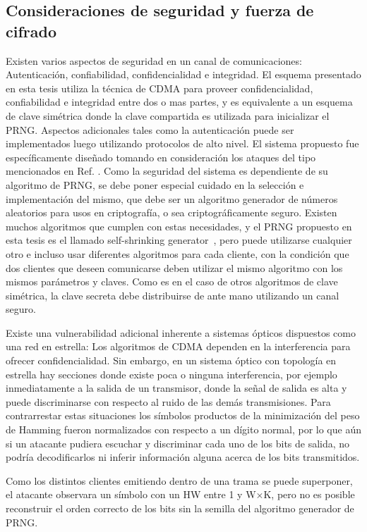 \subsection{Consideraciones de seguridad y fuerza de cifrado}\label{Seguridad-fuerza}
Existen varios aspectos de seguridad en un canal de comunicaciones: Autenticación, confiabilidad, confidencialidad e integridad.
El esquema presentado en esta tesis utiliza la técnica de CDMA para proveer confidencialidad, confiabilidad e integridad entre dos o mas partes, y es equivalente a un esquema de clave simétrica donde la clave compartida es utilizada para inicializar el PRNG. Aspectos adicionales tales como la autenticación puede ser implementados luego utilizando protocolos de alto nivel.
El sistema propuesto fue específicamente diseñado tomando en consideración los ataques del tipo mencionados en Ref. \cite{Shake:05}.
Como la seguridad del sistema es dependiente de su algoritmo de PRNG, se debe poner especial cuidado en la selección e implementación del mismo, que debe ser un algoritmo generador de números aleatorios para usos en criptografía, o sea criptográficamente seguro. Existen muchos algoritmos que cumplen con estas necesidades, y el PRNG propuesto en esta tesis es el llamado self-shrinking generator~\cite{Meier:94}, pero puede utilizarse cualquier otro e incluso usar diferentes algoritmos para cada cliente, con la condición que dos clientes que deseen comunicarse deben utilizar el mismo algoritmo con los mismos parámetros y claves.
Como es en el caso de otros algoritmos de clave simétrica, la clave secreta debe distribuirse de ante mano utilizando un canal seguro.

Existe una vulnerabilidad adicional inherente a sistemas ópticos dispuestos como una red en estrella: Los algoritmos de CDMA dependen en la interferencia para ofrecer confidencialidad. Sin embargo, en un sistema óptico con topología en estrella hay secciones donde existe poca o ninguna interferencia, por ejemplo inmediatamente a la salida de un transmisor, donde la señal de salida es alta y puede discriminarse con respecto al ruido de las demás transmisiones. Para contrarrestar estas situaciones los símbolos productos de la minimización del peso de Hamming fueron normalizados con respecto a un dígito normal, por lo que aún si un atacante pudiera escuchar y discriminar cada uno de los bits de salida, no podría decodificarlos ni inferir información alguna acerca de los bits transmitidos.

Como los distintos clientes emitiendo dentro de una trama se puede superponer, el atacante observara un símbolo con un HW entre 1 y W$\times$K, pero no es posible reconstruir el orden correcto de los bits sin la semilla del algoritmo generador de PRNG.

